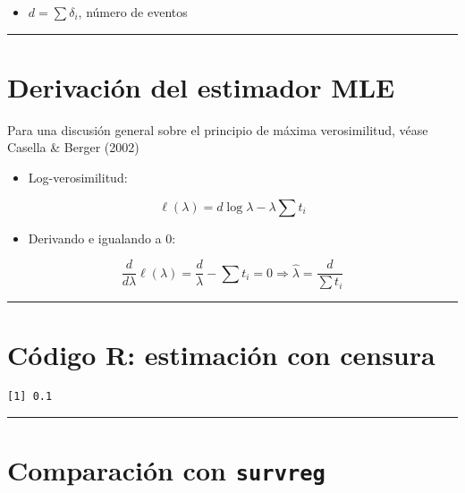 \documentclass[
]{article}
\providecommand{\tightlist}{%
  \setlength{\itemsep}{0pt}\setlength{\parskip}{0pt}}
\begin{document}
\begin{itemize}
\tightlist
\item
  \(d = \sum \delta_i\), número de eventos
\end{itemize}

\begin{center}\rule{0.5\linewidth}{0.5pt}\end{center}

\section{Derivación del estimador
MLE}\label{derivaciuxf3n-del-estimador-mle}

Para una discusión general sobre el principio de máxima verosimilitud,
véase Casella \& Berger (2002)

\begin{itemize}
\tightlist
\item
  Log-verosimilitud:
\end{itemize}

\[
\ell(\lambda) = d \log \lambda - \lambda \sum t_i
\]

\begin{itemize}
\tightlist
\item
  Derivando e igualando a 0:
\end{itemize}

\[
\frac{d}{d\lambda} \ell(\lambda) = \frac{d}{\lambda} - \sum t_i = 0
\Rightarrow \hat{\lambda} = \frac{d}{\sum t_i}
\]

\begin{center}\rule{0.5\linewidth}{0.5pt}\end{center}

\section{Código R: estimación con
censura}\label{cuxf3digo-r-estimaciuxf3n-con-censura}

\begin{verbatim}
[1] 0.1
\end{verbatim}

\begin{center}\rule{0.5\linewidth}{0.5pt}\end{center}

\section{\texorpdfstring{Comparación con
\texttt{survreg}}{Comparación con survreg}}\label{comparaciuxf3n-con-survreg}
\end{document}
